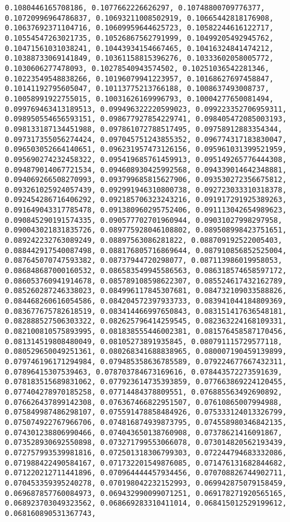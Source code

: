 \documentclass[11pt]{article}
\begin{document}
\begin{Verbatim}[commandchars=\\\{\}]
0.1080446165708186, 0.1077662226626297, 0.10748800709776377, 0.10720996964786837, 0.10693211008502919, 0.10665442818176908, 0.10637692371104716, 0.10609959644625723, 0.10582244616122717, 0.10554547263021735, 0.10526867562791999, 0.10499205492945762, 0.10471561031038241, 0.10443934154667465, 0.10416324841474212, 0.10388733069141849, 0.10361158815396276, 0.10333602058005772, 0.1030606277478093, 0.10278540943574502, 0.10251036542281346, 0.10223549548838266, 0.10196079941223957, 0.10168627697458847, 0.10141192795605047, 0.10113775213766188, 0.1008637493008737, 0.10058991922755015, 0.10031626169996793, 0.10004277650081494, 0.099769463413189513, 0.099496322220599023, 0.099223352706959311, 0.098950554656593151, 0.098677927854229741, 0.098405472085003193, 0.098133187134451988, 0.097861072788517495, 0.09758912883354344, 0.097317355056274424, 0.097045751243855352, 0.096774317183830047, 0.096503052664140651, 0.096231957473126156, 0.095961031399521959, 0.095690274232458322, 0.095419685761459913, 0.095149265776444308, 0.094879014067721534, 0.094608930425992568, 0.094339014642348881, 0.094069266508270993, 0.093799685815627906, 0.093530272356675812, 0.093261025924057439, 0.092991946310800738, 0.092723033310318378, 0.092454286716406292, 0.092185706323243216, 0.091917291925389263, 0.091649043317785478, 0.091380960295752406, 0.091113042654989623, 0.090845290191574335, 0.090577702701960944, 0.09031027998297958, 0.090043021831835726, 0.089775928046108802, 0.089508998423751651, 0.089242232763089249, 0.08897563086281822, 0.088709192522005403, 0.088442917540087498, 0.088176805716869644, 0.087910856852525004, 0.087645070747593382, 0.08737944720298077, 0.087113986019958053, 0.086848687000160532, 0.086583549945586563, 0.086318574658597172, 0.086053760941914678, 0.085789108598622307, 0.085524617432162789, 0.085260287246338023, 0.084996117845307681, 0.084732109033588826, 0.084468260616054586, 0.084204572397933733, 0.083941044184809369, 0.083677675782618519, 0.083414466997650843, 0.083151417636548181, 0.082888527506303322, 0.082625796414259545, 0.082363224168109331, 0.082100810575893995, 0.081838555446002381, 0.081576458587170456, 0.081314519808480049, 0.08105273891935845, 0.080791115729577118, 0.080529650049251361, 0.080268341688838965, 0.080007190459139899, 0.079746196171294984, 0.079485358636785589, 0.079224677667432311, 0.07896415307539463, 0.078703784673169616, 0.078443572273591639, 0.078183515689831062, 0.077923614735393859, 0.077663869224120455, 0.077404278970185258, 0.07714484378809551, 0.076885563492690892, 0.076626437899142308, 0.076367466822951507, 0.07610865007994988, 0.075849987486298107, 0.075591478858484926, 0.075333124013326799, 0.075074922767966706, 0.074816874939873795, 0.074558980346842135, 0.074301238806990466, 0.074043650138760908, 0.07378621416091867, 0.073528930692550898, 0.073271799553066078, 0.073014820562193439, 0.072757993539981816, 0.072501318306799303, 0.072244794683332086, 0.071988422490584167, 0.071732201549876085, 0.071476131682844682, 0.071220212711441896, 0.070964444457934456, 0.070708826744902711, 0.070453359395240278, 0.070198042232152993, 0.069942875079158459, 0.069687857760084973, 0.069432990099071251, 0.069178271920565165, 0.068923703049323562, 0.068669283310411014, 0.068415012529199612, 0.068160890531367743, 
\end{Verbatim}
\end{document}
